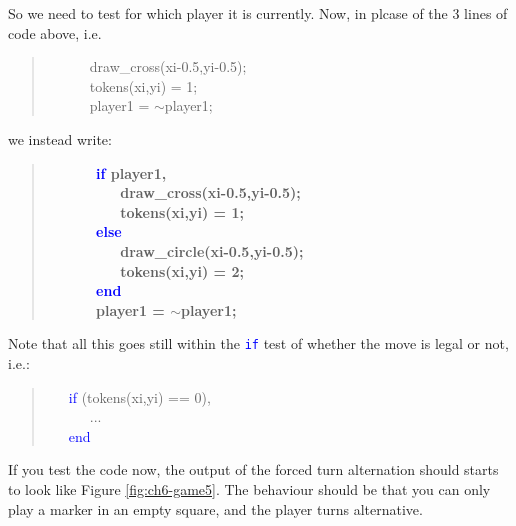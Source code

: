 \documentclass{tufte-book} %
\newenvironment{docspec}{\begin{quotation}\ttfamily\parskip0pt\parindent0pt\ignorespaces}{\end{quotation}}
\newenvironment{docspecbold}{\begin{quotation}\ttfamily\bfseries\parskip0pt\parindent0pt\ignorespaces}{\end{quotation}}
\begin{document}
So we need to test for which player it is currently. Now, in plcase of the 3 lines of code above, i.e.
\begin{docspec}
\ \ \ \ \ \         draw\_cross(xi-0.5,yi-0.5);\\
\ \ \ \ \ \        tokens(xi,yi) = 1;\\
\ \ \ \ \ \         player1 = \(\sim\)player1;
\end{docspec}
we instead write:
\begin{docspecbold}
\ \ \ \ \ \          \textcolor{blue}{if} player1,\\
\ \ \ \ \ \ \ \ \             draw\_cross(xi-0.5,yi-0.5);\\
\ \ \ \ \ \ \ \ \             tokens(xi,yi) = 1;\\
\ \ \ \ \ \         \textcolor{blue}{else}\\
\ \ \ \ \ \ \ \ \             draw\_circle(xi-0.5,yi-0.5);\\
\ \ \ \ \ \ \ \ \             tokens(xi,yi) = 2;\\
\ \ \ \ \ \         \textcolor{blue}{end}\\
\ \ \ \ \ \         player1 = \(\sim\)player1;
\end{docspecbold}
Note that all this goes still within the \texttt{\textcolor{blue}{if}} test of whether the move is legal or not, i.e.:
\begin{docspec}
\ \ \     \textcolor{blue}{if} (tokens(xi,yi) == 0),\\
\ \ \ \ \ \         ...\\
\ \ \     \textcolor{blue}{end}
\end{docspec}

If you test the code now, the output of the forced turn alternation should starts to look like Figure \ref{fig:ch6-game5}. The behaviour should be that you can only play a marker in an empty square, and the player turns alternative.
\end{document}
